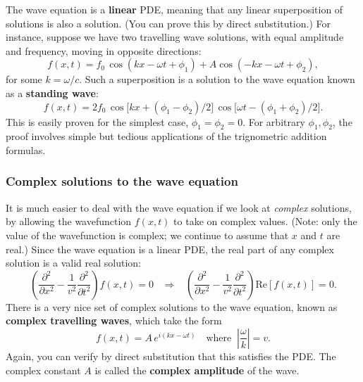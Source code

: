 \documentclass[10pt,a4paper]{article}
\begin{document}
The wave equation is a \textbf{linear} PDE, meaning that any linear
superposition of solutions is also a solution. (You can prove this by
direct substitution.) For instance, suppose we have two travelling wave
solutions, with equal amplitude and frequency, moving in opposite
directions:
\begin{equation}
f(x,t) = f_0 \, \cos(kx - \omega t + \phi_1) + A \cos(-kx - \omega t + \phi_2),
\end{equation}
for some $k = \omega/c$. Such a superposition is a solution to the
wave equation known as a \textbf{standing wave}:
\begin{equation}
f(x,t) = 2f_0 \, \cos\big[kx + (\phi_1-\phi_2)/2\big]\, \cos\big[\omega t - (\phi_1+\phi_2)/2\big].
\end{equation}
This is easily proven for the simplest case, $\phi_1 = \phi_2 = 0$.
For arbitrary $\phi_1, \phi_2$, the proof involves simple but tedious
applications of the trignometric addition formulas.

\subsubsection{Complex solutions to the wave equation}
\label{complex-solutions-to-the-wave-equation}

It is much easier to deal with the wave equation if we look at
\emph{complex} solutions, by allowing the wavefunction $f(x,t)$ to
take on complex values. (Note: only the value of the wavefunction is
complex; we continue to assume that $x$ and $t$ are real.) Since the
wave equation is a linear PDE, the real part of any complex solution
is a valid real solution:
\begin{equation}
\left(\frac{\partial^2}{\partial x^2} - \frac{1}{v^2} \frac{\partial^2}{\partial t^2}\right) f(x,t) = 0 \;\;\;\Rightarrow \;\;\; \left(\frac{\partial^2}{\partial x^2} - \frac{1}{v^2} \frac{\partial^2}{\partial t^2}\right) \mathrm{Re}\left[f(x,t)\right] = 0.
\end{equation}
There is a very nice set of complex solutions to the wave equation,
known as \textbf{complex travelling waves}, which take the form
\begin{equation}
f(x,t) = A \, e^{i(kx - \omega t)} \quad\mathrm{where}\;\; \left|\frac{\omega}{k}\right| = v.
\end{equation}
Again, you can verify by direct substitution that this satisfies the
PDE. The complex constant $A$ is called the \textbf{complex amplitude}
of the wave.
\end{document}
